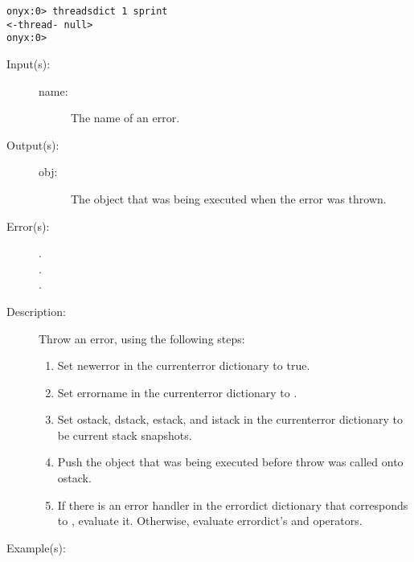 \begin{description}
\begin{description}
\begin{verbatim}
onyx:0> threadsdict 1 sprint
<-thread- null>
onyx:0>
		\end{verbatim}
	\end{description}
\label{systemdict:throw}
\item[{\onyxop{name}{throw}{obj}}: ]
	\begin{description}\item[]
	\item[Input(s): ]
		\begin{description}\item[]
		\item[name: ] The name of an error.
		\end{description}
	\item[Output(s): ]
		\begin{description}\item[]
		\item[obj: ]
			The object that was being executed when the error was
			thrown.
		\end{description}
	\item[Error(s): ]
		\begin{description}\item[]
		\item[.]
		\item[.]
		\item[.]
		\end{description}
	\item[Description: ]
		Throw an error, using the following steps:
		\begin{enumerate}
		\item{Set newerror in the currenterror dictionary to true.}
		\item{Set errorname in the currenterror dictionary to
		.}
		\item{Set ostack, dstack, estack, and istack in the currenterror
		dictionary to be current stack snapshots.}
		\item{Push the object that was being executed before throw was
		called onto ostack.}
		\item{If there is an error handler in the errordict dictionary
		that corresponds to , evaluate it.  Otherwise,
		evaluate errordict's
		 and
		 operators.}
		\end{enumerate}
	\item[Example(s): ]\begin{verbatim}


\end{verbatim}
\end{description}
\end{description}
